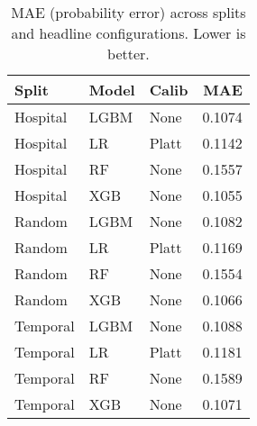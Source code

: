 \begin{table}[H]
\centering
\caption{MAE (probability error) across splits and headline configurations. Lower is better.}
\label{tab:mae-summary}
\begin{tabular}{l l l r}
\toprule
Split & Model & Calib & MAE \\
\midrule
Hospital & LGBM & None & 0.1074 \\
Hospital & LR & Platt & 0.1142 \\
Hospital & RF & None & 0.1557 \\
Hospital & XGB & None & 0.1055 \\
Random & LGBM & None & 0.1082 \\
Random & LR & Platt & 0.1169 \\
Random & RF & None & 0.1554 \\
Random & XGB & None & 0.1066 \\
Temporal & LGBM & None & 0.1088 \\
Temporal & LR & Platt & 0.1181 \\
Temporal & RF & None & 0.1589 \\
Temporal & XGB & None & 0.1071 \\
\bottomrule
\end{tabular}
\end{table}